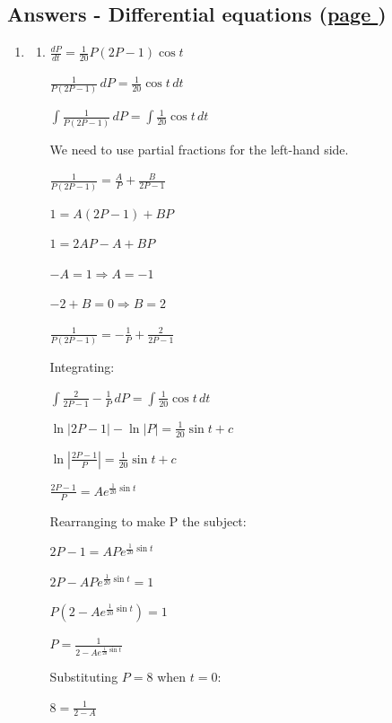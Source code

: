 \documentclass[../main.tex]{subfiles}
\begin{document}
\hypertarget{differentialequationsanswers}{\subsection*{Answers - Differential equations (\hyperlink{differentialequationslink}{page \pageref{Differential equations}})}}

\label{Differential equations answers}
\begin{spacing}{1.5}
\begin{enumerate}[itemsep=0.7cm]
    \item 
    \begin{enumerate}[itemsep=0.5cm]
        \item
        
        $\frac{dP}{dt}=\frac{1}{20}P(2P-1)\cos{t}$

        $\frac{1}{P(2P-1)}\,dP=\frac{1}{20}\cos{t}\,dt$

        $\int \frac{1}{P(2P-1)}\,dP=\int \frac{1}{20}\cos{t}\,dt$

        We need to use partial fractions for the left-hand side.

        $\frac{1}{P(2P-1)}=\frac{A}{P}+\frac{B}{2P-1}$

        $1=A(2P-1)+BP$

        $1=2AP-A+BP$

        $-A=1 \Rightarrow A=-1$

        $-2+B=0 \Rightarrow B=2$

        $\frac{1}{P(2P-1)}=-\frac{1}{P}+\frac{2}{2P-1}$

        Integrating:

        $\int \frac{2}{2P-1}-\frac{1}{P}\,dP=\int \frac{1}{20}\cos{t}\,dt$

        $\ln|2P-1|-\ln|P|=\frac{1}{20}\sin{t}+c$

        $\ln|\frac{2P-1}{P}|=\frac{1}{20}\sin{t}+c$

        $\frac{2P-1}{P}=Ae^{\frac{1}{20}\sin{t}}$

        Rearranging to make P the subject:

        $2P-1=APe^{\frac{1}{20}\sin{t}}$

        $2P-APe^{\frac{1}{20}\sin{t}}=1$

        $P(2-Ae^{\frac{1}{20}\sin{t}})=1$

        $P=\frac{1}{2-Ae^{\frac{1}{20}\sin{t}}}$

        Substituting $P=8$ when $t=0$:

        $8=\frac{1}{2-A}$


\end{enumerate}
\end{enumerate}
\end{spacing}
\end{document}
